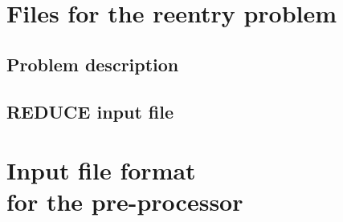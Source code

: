 \documentclass[12pt,a4paper]{article}
\newcommand{\REDUCE}{{\sf\bf REDUCE}}
\newlength{\dummy}
\begin{document}
\newpage

\section[\protect\hspace*{\dummy}Files for the reentry problem]%
        {Files for the reentry problem}

\label{java.app-SB}

\small

\subsection{Problem description}



\subsection{\REDUCE{} input file}


\newpage

\section[\protect\hspace*{\dummy}Input file format for the pre-processor]%
        {Input file format\\ for the pre-processor}

\label{java.app:perl-file}
\end{document}
